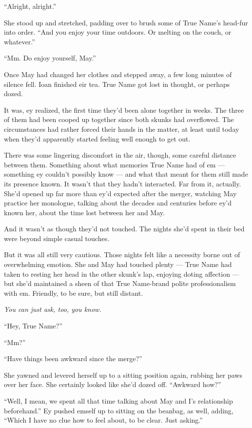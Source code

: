 ``Alright, alright.''

She stood up and stretched, padding over to brush some of True Name's head-fur into order. ``And you enjoy your time outdoors. Or melting on the couch, or whatever.''

``Mm. Do enjoy yourself, May.''

Once May had changed her clothes and stepped away, a few long minutes of silence fell. Ioan finished eir tea. True Name got lost in thought, or perhaps dozed.

It was, ey realized, the first time they'd been alone together in weeks. The three of them had been cooped up together since both skunks had overflowed. The circumstances had rather forced their hands in the matter, at least until today when they'd apparently started feeling well enough to get out.

There was some lingering discomfort in the air, though, some careful distance between them. Something about what memories True Name had of em — something ey couldn't possibly know — and what that meant for them still made its presence known. It wasn't that they hadn't interacted. Far from it, actually. She'd opened up far more than ey'd expected after the merger, watching May practice her monologue, talking about the decades and centuries before ey'd known her, about the time lost between her and May.

And it wasn't as though they'd not touched. The nights she'd spent in their bed were beyond simple casual touches.

But it was all still very cautious. Those nights felt like a necessity borne out of overwhelming emotion. She and May had touched plenty — True Name had taken to resting her head in the other skunk's lap, enjoying doting affection — but she'd maintained a sheen of that True Name-brand polite professionalism with em. Friendly, to be sure, but still distant.

\emph{You can just ask, too, you know.}

``Hey, True Name?''

``Mm?''

``Have things been awkward since the merge?''

She yawned and levered herself up to a sitting position again, rubbing her paws over her face. She certainly looked like she'd dozed off. ``Awkward how?''

``Well, I mean, we spent all that time talking about May and I's relationship beforehand.'' Ey pushed emself up to sitting on the beanbag, as well, adding, ``Which I have no clue how to feel about, to be clear. Just asking.''

